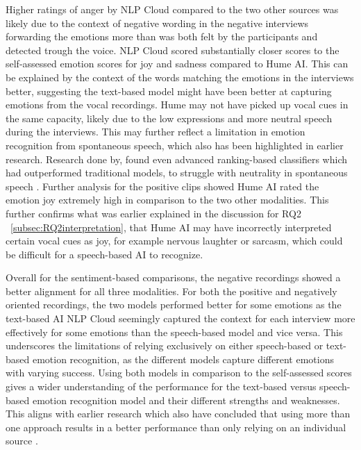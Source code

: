 Higher ratings of anger by NLP Cloud compared to the two other sources was likely due to the context of negative wording in the negative interviews forwarding the emotions more than was both felt by the participants and detected trough the voice.
NLP Cloud scored substantially closer scores to the self-assessed emotion scores for joy and sadness compared to Hume AI. This can be explained by the context of the words matching the emotions in the interviews better, suggesting the text-based model might have been better at capturing emotions from the vocal recordings. Hume may not have picked up vocal cues in the same capacity, likely due to the low expressions and more neutral speech during the interviews. This may further reflect a limitation in emotion recognition from spontaneous speech, which also has been highlighted in earlier research. Research done by\textcite{Cao2015}, found even advanced ranking-based classifiers which had outperformed traditional models, to struggle with neutrality in spontaneous speech \autocite{Cao2015}.
Further analysis for the positive clips showed Hume AI rated the emotion joy extremely high in comparison to the two other modalities. This further confirms what was earlier explained in the discussion for RQ2 ~\ref{subsec:RQ2interpretation}, that Hume AI may have incorrectly interpreted certain vocal cues as joy, for example nervous laughter or sarcasm, which could be difficult for a speech-based AI to recognize.

Overall for the sentiment-based comparisons, the negative recordings showed a better alignment for all three modalities. For both the positive and negatively oriented recordings, the two models performed better for some emotions as the text-based AI NLP Cloud seemingly captured the context for each interview more effectively for some emotions than the speech-based model and vice versa. This underscores the limitations of relying exclusively on either speech-based or text-based emotion recognition, as the different models capture different emotions with varying success. Using both models in comparison to the self-assessed scores gives a wider understanding of the performance for the text-based versus speech-based emotion recognition model and their different strengths and weaknesses. This aligns with earlier research which also have concluded that using more than one approach results in a better performance than only relying on an individual source \autocite{Cao2015}.

